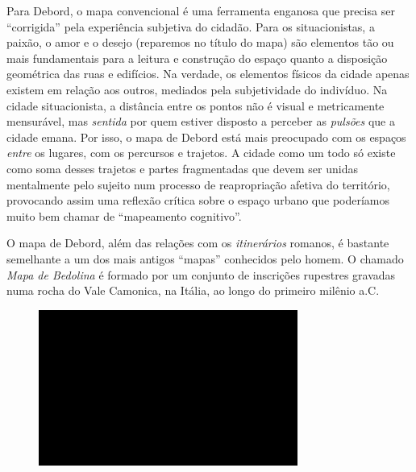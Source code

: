 Para Debord, o mapa convencional é uma ferramenta enganosa que precisa
ser ``corrigida'' pela experiência subjetiva do cidadão. Para os
situacionistas, a paixão, o amor e o desejo (reparemos no título do
mapa) são elementos tão ou mais fundamentais para a leitura e construção
do espaço quanto a disposição geométrica das ruas e edifícios. Na
verdade, os elementos físicos da cidade apenas existem em relação aos
outros, mediados pela subjetividade do indivíduo. Na cidade
situacionista, a distância entre os pontos não é visual e metricamente
mensurável, mas \emph{sentida} por quem estiver disposto a perceber as
\emph{pulsões} que a cidade emana. Por isso, o mapa de Debord está mais
preocupado com os espaços \emph{entre} os lugares, com os percursos e
trajetos. A cidade como um todo só existe como soma desses trajetos e
partes fragmentadas que devem ser unidas mentalmente pelo sujeito num
processo de reapropriação afetiva do território, provocando assim uma
reflexão crítica sobre o espaço urbano que poderíamos muito bem chamar
de ``mapeamento cognitivo''.

O mapa de Debord, além das relações com os \emph{itinerários} romanos, é
bastante semelhante a um dos mais antigos ``mapas'' conhecidos pelo
homem. O chamado \emph{Mapa de Bedolina} é formado por um conjunto de
inscrições rupestres gravadas numa rocha do Vale Camonica, na Itália, ao
longo do primeiro milênio a.C.

\begin{figure}[!ht]

\centering
 \includegraphics[width=85mm]{./imgs/im1.jpg}
\caption{\tiny{}}

\end{figure}

